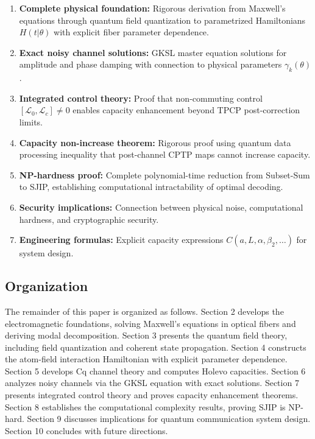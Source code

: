 \documentclass[12pt,a4paper]{article}
\newcommand{\cL}{\mathcal{L}}
\begin{document}
\begin{enumerate}
\item \textbf{Complete physical foundation:} Rigorous derivation from Maxwell's equations through quantum field quantization to parametrized Hamiltonians $H(t|\theta)$ with explicit fiber parameter dependence.

\item \textbf{Exact noisy channel solutions:} GKSL master equation solutions for amplitude and phase damping with connection to physical parameters $\gamma_k(\theta)$.

\item \textbf{Integrated control theory:} Proof that non-commuting control $[\cL_0, \cL_c] \neq 0$ enables capacity enhancement beyond TPCP post-correction limits.

\item \textbf{Capacity non-increase theorem:} Rigorous proof using quantum data processing inequality that post-channel CPTP maps cannot increase capacity.

\item \textbf{NP-hardness proof:} Complete polynomial-time reduction from Subset-Sum to SJIP, establishing computational intractability of optimal decoding.

\item \textbf{Security implications:} Connection between physical noise, computational hardness, and cryptographic security.

\item \textbf{Engineering formulas:} Explicit capacity expressions $C(a, L, \alpha, \beta_2, \ldots)$ for system design.
\end{enumerate}

\subsection{Organization}

The remainder of this paper is organized as follows. Section 2 develops the electromagnetic foundations, solving Maxwell's equations in optical fibers and deriving modal decomposition. Section 3 presents the quantum field theory, including field quantization and coherent state propagation. Section 4 constructs the atom-field interaction Hamiltonian with explicit parameter dependence. Section 5 develops Cq channel theory and computes Holevo capacities. Section 6 analyzes noisy channels via the GKSL equation with exact solutions. Section 7 presents integrated control theory and proves capacity enhancement theorems. Section 8 establishes the computational complexity results, proving SJIP is NP-hard. Section 9 discusses implications for quantum communication system design. Section 10 concludes with future directions.
\end{document}

